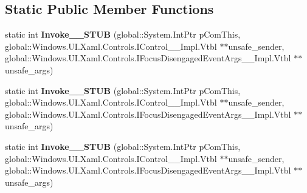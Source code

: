 \subsection*{Static Public Member Functions}
\begin{DoxyCompactItemize}
\item 
\mbox{\label{struct_windows_1_1_foundation_1_1_typed_event_handler___a___windows___u_i___xaml___controls___cof52bacf1f8ce9dc6f9ea3c7dd11a16ef_abf135669e1854e3449624bff02c28cf0}} 
static int {\bfseries Invoke\+\_\+\+\_\+\+S\+T\+UB} (global\+::\+System.\+Int\+Ptr p\+Com\+This, global\+::\+Windows.\+U\+I.\+Xaml.\+Controls.\+I\+Control\+\_\+\+\_\+\+Impl.\+Vtbl $\ast$$\ast$unsafe\+\_\+sender, global\+::\+Windows.\+U\+I.\+Xaml.\+Controls.\+I\+Focus\+Disengaged\+Event\+Args\+\_\+\+\_\+\+Impl.\+Vtbl $\ast$$\ast$unsafe\+\_\+args)
\item 
\mbox{\label{struct_windows_1_1_foundation_1_1_typed_event_handler___a___windows___u_i___xaml___controls___cof52bacf1f8ce9dc6f9ea3c7dd11a16ef_abf135669e1854e3449624bff02c28cf0}} 
static int {\bfseries Invoke\+\_\+\+\_\+\+S\+T\+UB} (global\+::\+System.\+Int\+Ptr p\+Com\+This, global\+::\+Windows.\+U\+I.\+Xaml.\+Controls.\+I\+Control\+\_\+\+\_\+\+Impl.\+Vtbl $\ast$$\ast$unsafe\+\_\+sender, global\+::\+Windows.\+U\+I.\+Xaml.\+Controls.\+I\+Focus\+Disengaged\+Event\+Args\+\_\+\+\_\+\+Impl.\+Vtbl $\ast$$\ast$unsafe\+\_\+args)
\item 
\mbox{\label{struct_windows_1_1_foundation_1_1_typed_event_handler___a___windows___u_i___xaml___controls___cof52bacf1f8ce9dc6f9ea3c7dd11a16ef_abf135669e1854e3449624bff02c28cf0}} 
static int {\bfseries Invoke\+\_\+\+\_\+\+S\+T\+UB} (global\+::\+System.\+Int\+Ptr p\+Com\+This, global\+::\+Windows.\+U\+I.\+Xaml.\+Controls.\+I\+Control\+\_\+\+\_\+\+Impl.\+Vtbl $\ast$$\ast$unsafe\+\_\+sender, global\+::\+Windows.\+U\+I.\+Xaml.\+Controls.\+I\+Focus\+Disengaged\+Event\+Args\+\_\+\+\_\+\+Impl.\+Vtbl $\ast$$\ast$unsafe\+\_\+args)
\item 
\mbox{\label{struct_windows_1_1_foundation_1_1_typed_event_handler___a___windows___u_i___xaml___controls___cof52bacf1f8ce9dc6f9ea3c7dd11a16ef_abf135669e1854e3449624bff02c28cf0}} 

\end{DoxyCompactItemize}
